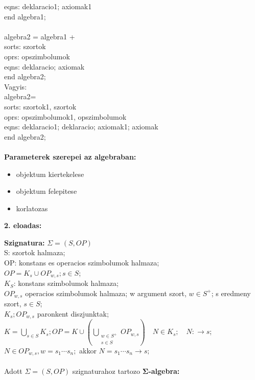 \documentclass[a4paper,10pt]{article}
\begin{document}
\indent eqns: deklaracio1; axiomak1\\
end algebra1;\\
\\
algebra2 = algebra1 +\\
\indent sorts: szortok\\
\indent oprs: opszimbolumok\\
\indent eqns: deklaracio; axiomak\\
end algebra2;\\
Vagyis:\\
algebra2=\\
\indent sorts: szortok1, szortok\\
\indent oprs: opszimbolumok1, opszimbolumok\\
\indent eqns: deklaracio1; deklaracio; axiomak1; axiomak\\
end algebra2;\\\\
\textbf{Parameterek szerepei az algebraban:}
\begin{itemize}
\item objektum kiertekelese
\item objektum felepitese
\item korlatozas
\end{itemize}
\newpage
%
%
\begin{flushleft}
\textbf{2. eloadas:}
\end{flushleft}
\textbf{Szignatura:} $\Sigma=(S,OP)$\\
\indent S: szortok halmaza;\\
\indent OP: konstans es operacios szimbolumok halmaza;\\
\indent \indent $OP=K_s\cup OP_{w,s}; s\in S$;\\
\indent $K_S$: konstans szimbolumok halmaza;\\
\indent $OP_{w,s}$ operacios szimbolumok halmaza; \indent w argument szort, $w\in S^+$; s eredmeny szort, $s\in S$;\\
\indent $K_s ; OP_{w,s}$ paronkent diszjunktak;\\
\indent $\displaystyle K=\bigcup_{s\in S}K_s; OP =K\cup(\bigcup_{\substack{w \in S^+\\s\in S}} OP_{w,s}) \quad N \in K_s; \quad N:\to s$;\\
$N \in OP_{w,s}, w=s_1 \cdots s_n ;$ akkor $N=s_1 \cdots s_n\to s;$\\ \\
%
Adott $\Sigma=(S,OP)$ szignaturahoz tartozo \textbf{$\mathbf{\Sigma}$-algebra:}\\
\end{document}
